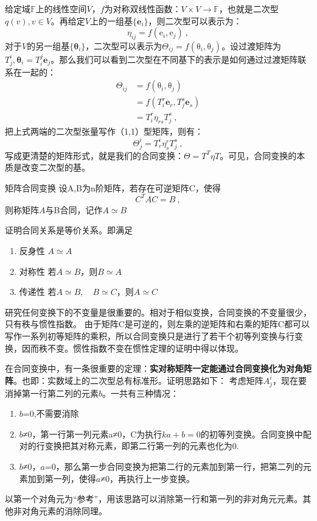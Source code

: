 
给定域$\mathbb F$上的线性空间$V$，$f$为对称双线性函数：$V\times V\to \mathbb F$，也就是二次型$q(v),v\in V$。再给定$V$上的一组基$\{\boldsymbol e_i\}$，则二次型可以表示为：
\begin{equation}
\eta_{ij}=f(\boldsymbol {\mathrm e}_i,\boldsymbol {\mathrm e}_j)~,
\end{equation}
对于$V$的另一组基$\{\boldsymbol \theta_i\}$，二次型可以表示为$\Theta_{ij}=f(\boldsymbol {\mathrm \theta}_{i},\boldsymbol {\mathrm \theta}_{j})$。设过渡矩阵为$T^i_j,\boldsymbol {\theta}_i=T^j_i\boldsymbol e_j$。那么我们可以看到二次型在不同基下的表示是如何通过过渡矩阵联系在一起的：
\begin{equation}
\begin{aligned}
\Theta_{ij}&=f(\boldsymbol {\mathrm \theta}_{i},\boldsymbol {\mathrm \theta}_{j})\\
&=f(T^r_i\boldsymbol e_r,T^s_j\boldsymbol e_s)\\
&=T^r_i \eta_{rs}T^s_j~,
\end{aligned}
\end{equation}
把上式两端的二次型张量写作（1,1）型矩阵，则有：
$$\Theta^i_j=T^i_r\eta^r_sT^s_j~,$$
写成更清楚的矩阵形式，就是我们的合同变换：$\Theta=T^T\eta T$。可见，合同变换的本质是改变二次型的基。
\begin{definition}{矩阵合同变换}
设A,B为n阶矩阵，若存在可逆矩阵C，使得
\begin{equation}
C^TAC=B~,
\end{equation}
则称矩阵$A$与B合同，记作$A\simeq B$
\end{definition}
\begin{exercise}{}
证明合同关系是等价关系。即满足
\begin{enumerate}
\item 反身性  $A\simeq A$
\item 对称性  若$A\simeq B$，则$B\simeq A$
\item 传递性  若$A\simeq B,\quad B\simeq C$，则$A\simeq C$
\end{enumerate}
\end{exercise}
研究任何变换下的不变量是很重要的。相对于相似变换，合同变换的不变量很少，只有秩与惯性指数。
由于矩阵C是可逆的，则左乘的逆矩阵和右乘的矩阵C都可以写作一系列初等矩阵的乘积，所以合同变换只是进行了若干个初等列变换与行变换，因而秩不变。惯性指数不变在惯性定理的证明中得以体现。

在合同变换中，有一条很重要的定理：\textbf{实对称矩阵一定能通过合同变换化为对角矩阵}。也即：实数域上的二次型总有标准形。证明思路如下：
考虑矩阵$A^i_j$，现在要消掉第一行第二列的元素$b$。一共有三种情况：
\begin{enumerate}
\item $b$=0,不需要消除
\item $b$≠0，第一行第一列元素a≠0，C为执行$ka+b=0$的初等列变换。合同变换中配对的行变换把其对称元素，即第二行第一列的元素也化为0.
\item $b$≠0，$a$=0，那么第一步合同变换为把第二行的元素加到第一行，把第二列的元素加到第一列，使得$a$≠0，再执行上一步变换。
\end{enumerate}
以第一个对角元为“参考”，用该思路可以消除第一行和第一列的非对角元元素。其他非对角元素的消除同理。

